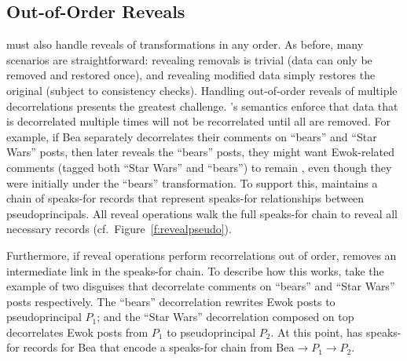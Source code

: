 %
%

\subsection{Out-of-Order Reveals}
\sys must also handle reveals of transformations in any order.  As before,
many scenarios are straightforward: revealing removals is trivial (data can
only be removed and restored once), and revealing modified data simply restores
the original (subject to consistency checks).
%
Handling out-of-order reveals of multiple decorrelations presents the
greatest challenge.
%
\sys's semantics enforce that data that is decorrelated multiple times will not
be recorrelated until all \xxs are removed.
%
For example, if Bea separately decorrelates their comments on ``bears''
and ``Star Wars'' posts, then later reveals the ``bears'' posts, they might want
Ewok-related comments (tagged both ``Star Wars'' and ``bears'') to remain
\xxed, even though they were initially \xxed under the ``bears'' transformation.
%
%
%
To support this, \sys maintains a chain of speaks-for records that represent
speaks-for relationships between pseudoprincipals.
%
All reveal operations walk the full speaks-for chain to reveal
all necessary records (cf.\ Figure~\ref{f:revealpseudo}).

Furthermore, if reveal operations perform recorrelations out of order, \sys
removes an intermediate link in the speaks-for chain.
%
To describe how this works, take the example of two disguises that decorrelate
comments on ``bears'' and ``Star Wars'' posts respectively. The ``bears''
decorrelation rewrites Ewok posts to pseudoprincipal $P_1$; and the ``Star
Wars'' decorrelation composed on top decorrelates Ewok posts from $P_1$ to
pseudoprincipal $P_2$.  At this point, \sys has speaks-for records for Bea that
encode a speaks-for chain from Bea$ \to P_1 \to P_2$.
%

